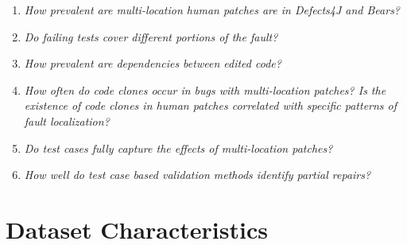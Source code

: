 \documentclass[sigconf, timestamp-false, anonymous=true]{acmart}
\begin{document}
\begin{enumerate}[label=RQ\arabic*:]
\item \emph{How prevalent are multi-location human patches are in Defects4J and Bears?}
\item \emph{Do failing tests cover different portions of the fault?}
\item \emph{How prevalent are dependencies between edited code?}
\item \emph{How often do code clones occur in bugs with multi-location
  patches? Is the existence of code clones in human patches correlated with specific
  patterns of fault localization?}
\item \emph{Do test cases fully capture the effects of multi-location patches?}
\item \emph{How well do test case based validation methods identify partial repairs?}

\end{enumerate}

\section{Dataset Characteristics}
\label{sec:data-rq1}
\end{document}
